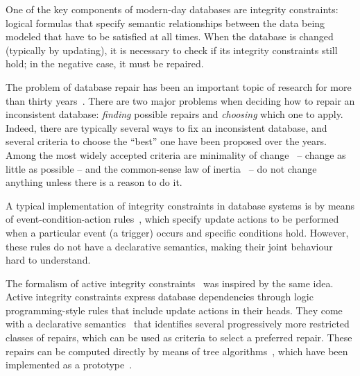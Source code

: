 One of the key components of modern-day databases are integrity constraints: logical formulas that specify semantic relationships between the data being modeled that have to be satisfied at all times.
When the database is changed (typically by updating), it is necessary to check if its integrity constraints still hold; in the negative case, it must be repaired.

The problem of database repair has been an important topic of research for more than thirty years~\cite{icdt/Abiteboul88}.
There are two major problems when deciding how to repair an inconsistent database: \emph{finding} possible repairs and \emph{choosing} which one to apply.
Indeed, there are typically several ways to fix an inconsistent database, and several criteria to choose the ``best'' one have been proposed over the years.
Among the most widely accepted criteria are minimality of change~\cite{Winslett90,ai/EiterG92} -- change as little as possible -- and the common-sense law of inertia~\cite{PrzymusinskiT97} -- do not change anything unless there is a reason to do it.

A typical implementation of integrity constraints in database systems is by means of event-condition-action rules~\cite{TenienteO95,WidomC96}, which specify update actions to be performed when a particular event (a trigger) occurs and specific conditions hold.
However, these rules do not have a declarative semantics, making their joint behaviour hard to understand.

The formalism of active integrity constraints~\cite{ppdp/FlescaGZ04} was inspired by the same idea.
Active integrity constraints express database dependencies through logic programming-style rules that include update actions in their heads.
They come with a declarative semantics~\cite{iclp/CaropreseGSZ06,tplp/CaropreseT11} that identifies several progressively more restricted classes of repairs, which can be used as criteria to select a preferred repair.
These repairs can be computed directly by means of tree algorithms~\cite{tase/Cruz-FilipeEGN13}, which have been implemented as a prototype~\cite{CFHLNS15}.

